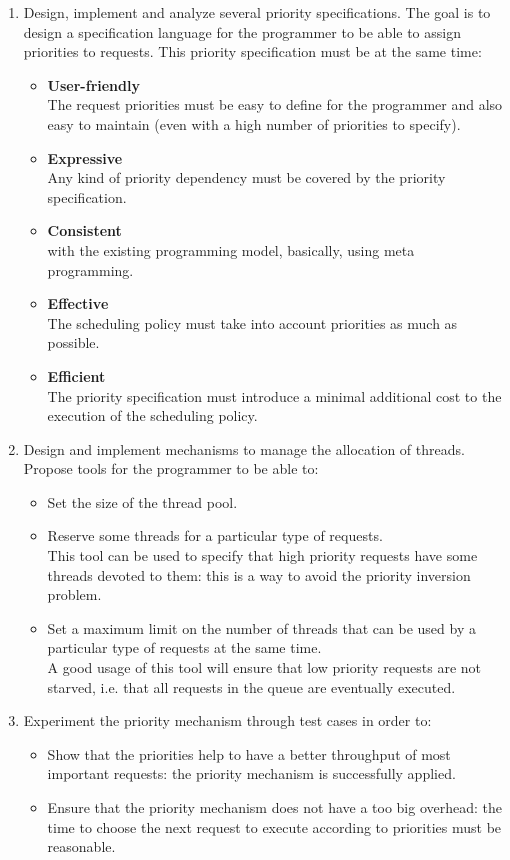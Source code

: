 \documentclass[11pt]{report}
\begin{document}
\begin{enumerate}
\item Design, implement and analyze several priority specifications. The goal is to design a specification language for the programmer to be able to assign priorities to requests. This priority specification must be at the same time:
	\begin{itemize}
	\item \textbf{User-friendly} \\The request priorities must be easy to define for the programmer and also easy to maintain (even with a high number of priorities to specify).
	\item \textbf{Expressive} \\Any kind of priority dependency must be covered by the priority specification.
	\item \textbf{Consistent} \\with the existing programming model, basically, using meta programming.
	\item \textbf{Effective} \\The scheduling policy must take into account priorities as much as possible.
	\item \textbf{Efficient} \\The priority specification must introduce a minimal additional cost to the execution of the scheduling policy.
	\end{itemize}
\item Design and implement mechanisms to manage the allocation of threads. Propose tools for the programmer to be able to:
	\begin{itemize}
	\item Set the size of the thread pool.
	\item Reserve some threads for a particular type of requests. \\This tool can be used to specify that high priority requests have some threads devoted to them: this is a way to avoid the priority inversion problem.
	\item Set a maximum limit on the number of threads that can be used by a particular type of requests at the same time. \\A good usage of this tool will ensure that low priority requests are not starved, i.e. that all requests in the queue are eventually executed.
	\end{itemize}
\item Experiment the priority mechanism through test cases in order to:
	\begin{itemize}
	\item Show that the priorities help to have a better throughput of most important requests: the priority mechanism is successfully applied.
	\item Ensure that the priority mechanism does not have a too big overhead: the time to choose the next request to execute according to priorities must be reasonable.
	\end{itemize}
\end{enumerate}
\end{document}
